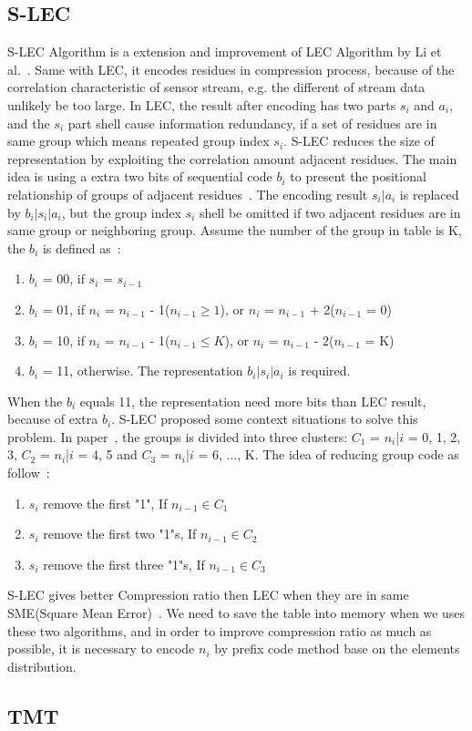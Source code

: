 \subsection{S-LEC}
S-LEC Algorithm is a extension and improvement of LEC Algorithm by Li et
al.~\cite{li2016temporal}. Same with LEC, it encodes residues in compression
process, because of the correlation characteristic of sensor stream, e.g. the
different of stream data unlikely be too large. In LEC, the result after
encoding has two parts $s_i$ and $ a_i$, and the $s_i$ part shell cause
information redundancy, if a set of residues are in same group which means
repeated group index $s_i$. S-LEC reduces the size of representation by
exploiting the correlation amount adjacent residues. The main idea is using a
extra two bits of sequential code $b_i$ to present the positional relationship
of groups of adjacent residues~\cite{li2016temporal}. The encoding result
$s_i|a_i$ is replaced by $b_i|s_i|a_i$, but the group index $s_i$ shell be
omitted if two adjacent residues are in same group or neighboring group. Assume
the number of the group in table is K, the $b_i$ is defined
as~\cite{li2016temporal}: 

\begin{enumerate}
    \item $b_i$ = 00, if $s_i$ = $s_{i-1}$
    \item $b_i$ = 01, if $n_i$ = $n_{i-1}$ - 1($n_{i-1} \geqslant 1$), or $n_i$
    = $n_{i-1}$ + 2($n_{i-1}$ = 0)
    \item $b_i$ = 10, if $n_i$ = $n_{i-1}$ - 1($n_{i-1} \leqslant K$), or $n_i$
    = $n_{i-1}$ - 2($n_{i-1}$ = K)
    \item $b_i$ = 11, otherwise. The representation $b_i|s_i|a_i$ is required. 
  \end{enumerate}

When the $b_i$ equals 11, the representation need more bits than LEC result,
because of extra $b_i$. S-LEC proposed some context situations to solve this
problem. In paper~\cite{li2016temporal}, the groups is divided into three
clusters: $C_1$ = {$n_i$|$i$ = 0, 1, 2, 3}, $C_2$ = {$n_i$|$i$ = 4, 5} and 
$C_3$ = {$n_i$|$i$ = 6, ..., K}. The idea of reducing group code as
follow~\cite{li2016temporal}:

\begin{enumerate}
    \item $s_i$ remove the first "1", If $n_{i-1} \in C_1$
    \item $s_i$ remove the first two "1"s, If $n_{i-1} \in C_2$
    \item $s_i$ remove the first three "1"s, If $n_{i-1} \in C_3$
\end{enumerate}
S-LEC gives better Compression ratio then LEC when they are in same SME(Square
Mean Error)~\cite{li2016temporal}. We need to save the table into memory when we
uses these two algorithms, and in order to improve compression ratio as much as
possible, it is necessary to encode $n_i$ by prefix code method base on the
elements distribution.

\subsection{TMT}
